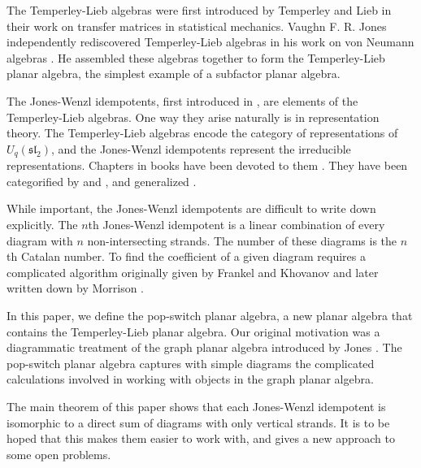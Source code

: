 
The Temperley-Lieb algebras were first introduced by Temperley and Lieb \cite{TL}
in their work on transfer matrices in statistical mechanics.  
Vaughn F. R. Jones independently rediscovered Temperley-Lieb algebras
in his work on von Neumann algebras \cite{Jones}.
He assembled these algebras together to form the Temperley-Lieb planar algebra,
the simplest example of a subfactor planar algebra. 

The Jones-Wenzl idempotents, first introduced in \cite{Wenzl}, are elements of the Temperley-Lieb algebras.
One way they arise naturally is in representation theory.
The Temperley-Lieb algebras encode
the category of representations of $U_q(\mathfrak{sl}_2)$,
and the Jones-Wenzl idempotents represent the irreducible representations.
Chapters in books have been devoted to them \cite{Kauffman}.
They have been categorified by \cite{JWcateg} and \cite{JWcateg2},
and generalized \cite{GenJW}.

While important, the Jones-Wenzl idempotents are difficult to write down explicitly.
The $n$th Jones-Wenzl idempotent  is a linear combination of
every diagram with $n$ non-intersecting strands.
The number of these diagrams is the $n$th Catalan number.
To find the coefficient of a given diagram requires a complicated algorithm
originally given by Frankel and Khovanov \cite{frenkel1997}
and later written down by Morrison \cite{Morr}.

In this paper,
we define the pop-switch planar algebra,
a new planar algebra that contains the Temperley-Lieb planar algebra.
Our original motivation was
a diagrammatic treatment of the graph planar algebra
introduced by Jones \cite{JonesGPA}. 
The pop-switch planar algebra captures  with simple diagrams the complicated calculations involved in working with objects in the graph planar algebra.

The main theorem of this paper shows that each Jones-Wenzl idempotent is isomorphic to a direct sum of diagrams with only vertical strands.  
It is to be hoped that
this makes them easier to work with,
and gives a new approach to some open problems.



